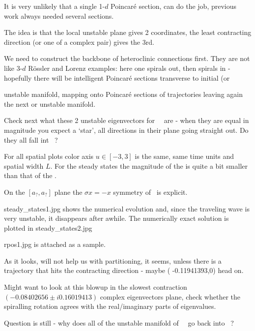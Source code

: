 It is very unlikely that a single 1-$d$ Poincar\'e section,
can do the job, previous work
always needed several sections.

The idea is that the local unstable plane gives 2 coordinates, the
least contracting direction (or one of a complex pair) gives the 3rd.

We need to construct the backbone of heteroclinic connections
first. They are not like 3-$d$ R\"ossler and Lorenz examples:
here one spirals out,
then spirals in - hopefully there will be intelligent Poincar\'e sections
transverse to initial  (or { unstable manifold, mapping onto
Poincar\'e sections of trajectories leaving again
the next  or  unstable manifold.


Check next what these 2 unstable eigenvectors for ~\eqv\ are - when they
are equal in magnitude you expect a `star', all directions in their plane
going straight out. Do they all fall int ~\eqv?

%

For all spatial plots color axis $u \in [-3, 3]$ is the same,
same time units and spatial width $L$.
For the steady states the magnitude of the  is quite
a bit smaller than that of the .

On the
    $[a_?,a_?]$ plane
    the $\sigma x = -x$ symmetry of \KSe\ is explicit.


steady\_states1.jpg shows the numerical evolution and, since the
traveling wave is very unstable, it disappears after awhile.
The numerically exact solution is plotted in steady\_states2.jpg

rpos1.jpg is attached as a sample.

As it looks, will not help us with partitioning, it seems, unless there is
a trajectory that hits the contracting direction - maybe
( -0.11941393,0)
head on.

Might want to look at this blowup in
the  slowest contraction
$   ( -0.08402656 \pm i 0.16019413)$
complex eigenvectors plane, check whether the
spiralling rotation agrees with the real/imaginary parts of eigenvalues.

Question is still - why does all of the unstable manifold of
~\eqv\ go back
into
~\eqv?

}

